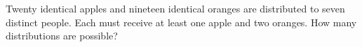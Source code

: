 Twenty identical apples and nineteen identical oranges are distributed to seven distinct people. Each must receive at least one apple and two oranges. How many distributions are possible?
